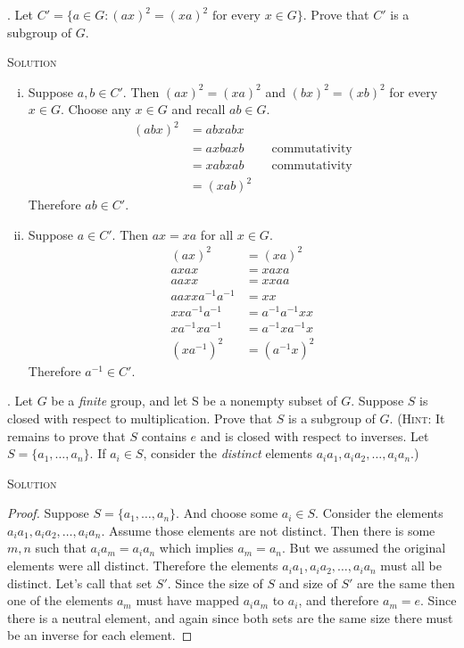 \documentclass[twoside]{amsart}
\newcommand{\solution}{\textsc{Solution}\xspace}
\begin{document}
\begin{enumerate}[A.]
   . Let $C' = \{ a\in G : (ax)^2 = (xa)^2 
   \text{ for every } x \in G\}$.  Prove that $C'$ is a subgroup of $G$.

   \noindent \solution
   \begin{enumerate}[(i)]
      \item Suppose $a,b \in C'$. Then $(ax)^2=(xa)^2$ and $(bx)^2=(xb)^2$
      for every $x \in G$. Choose any $x \in G$ and recall $ab \in G$.
      \begin{align*}
         (abx)^2 & = abxabx \\
	         & = axbaxb && \text{commutativity} \\
		 & = xabxab && \text{commutativity} \\
		 & = (xab)^2
      \end{align*}
      Therefore $ab \in C'$.

      \item Suppose $a \in C'$. Then $ax=xa$ for all $x \in G$.
      \begin{align*}
         (ax)^2 & = (xa)^2 \\
	 axax   & = xaxa \\
	 aaxx   & = xxaa \\
	 aaxxa^{-1}a^{-1} & = xx\\
	 xxa^{-1}a^{-1} & = a^{-1}a^{-1}xx \\
	 xa^{-1}xa^{-1} & = a^{-1}xa^{-1}x \\
	 (xa^{-1})^2    & = (a^{-1}x)^2
      \end{align*}
      Therefore $a^{-1} \in C'$.
   \end{enumerate}

   . Let $G$ be a \emph{finite} group, and let S be a nonempty 
   subset of $G$. Suppose $S$ is closed with respect to 
   multiplication. Prove that $S$ is a subgroup of $G$. (\textsc{Hint:} It
   remains to prove that $S$ contains $e$ and is closed with respect
   to inverses. Let $S=\{a_1,\ldots,a_n\}$. If $a_i \in S$, consider
   the \emph{distinct} elements $a_ia_1,a_ia_2,\ldots,a_ia_n$.)

   \noindent \solution
   \begin{proof}
   Suppose $S=\{a_1,\ldots,a_n\}$. And choose some $a_i \in S$. Consider
   the elements $a_ia_1,a_ia_2,\ldots,a_ia_n$. Assume those elements
   are not distinct. Then there is some $m,n$ such that $a_ia_m=a_ia_n$ 
   which implies $a_m=a_n$. But we assumed the original elements were
   all distinct. Therefore the elements $a_ia_1,a_ia_2,\ldots,a_ia_n$
   must all be distinct. Let's call that set $S'$.
   Since the size of $S$ and size of $S'$ are the same then one of the
   elements $a_m$ must have mapped $a_ia_m$ to $a_i$, and therefore
   $a_m=e$. Since there is a neutral element, and again since both sets are
   the same size there must be an inverse for each element.
   \end{proof}


\end{enumerate}
\end{document}
